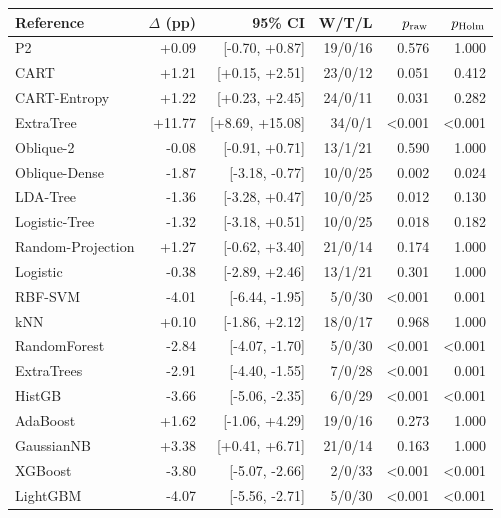 \begin{tabular}{lrrrrr}
\toprule
Reference & $\Delta$ (pp) & 95\% CI & W/T/L & $p_{\rm raw}$ & $p_{\rm Holm}$ \\
\midrule
P2 & +0.09 & [-0.70, +0.87] & 19/0/16 & 0.576 & 1.000 \\
CART & +1.21 & [+0.15, +2.51] & 23/0/12 & 0.051 & 0.412 \\
CART-Entropy & +1.22 & [+0.23, +2.45] & 24/0/11 & 0.031 & 0.282 \\
ExtraTree & +11.77 & [+8.69, +15.08] & 34/0/1 & <0.001 & <0.001 \\
Oblique-2 & -0.08 & [-0.91, +0.71] & 13/1/21 & 0.590 & 1.000 \\
Oblique-Dense & -1.87 & [-3.18, -0.77] & 10/0/25 & 0.002 & 0.024 \\
LDA-Tree & -1.36 & [-3.28, +0.47] & 10/0/25 & 0.012 & 0.130 \\
Logistic-Tree & -1.32 & [-3.18, +0.51] & 10/0/25 & 0.018 & 0.182 \\
Random-Projection & +1.27 & [-0.62, +3.40] & 21/0/14 & 0.174 & 1.000 \\
Logistic & -0.38 & [-2.89, +2.46] & 13/1/21 & 0.301 & 1.000 \\
RBF-SVM & -4.01 & [-6.44, -1.95] & 5/0/30 & <0.001 & 0.001 \\
kNN & +0.10 & [-1.86, +2.12] & 18/0/17 & 0.968 & 1.000 \\
RandomForest & -2.84 & [-4.07, -1.70] & 5/0/30 & <0.001 & <0.001 \\
ExtraTrees & -2.91 & [-4.40, -1.55] & 7/0/28 & <0.001 & 0.001 \\
HistGB & -3.66 & [-5.06, -2.35] & 6/0/29 & <0.001 & <0.001 \\
AdaBoost & +1.62 & [-1.06, +4.29] & 19/0/16 & 0.273 & 1.000 \\
GaussianNB & +3.38 & [+0.41, +6.71] & 21/0/14 & 0.163 & 1.000 \\
XGBoost & -3.80 & [-5.07, -2.66] & 2/0/33 & <0.001 & <0.001 \\
LightGBM & -4.07 & [-5.56, -2.71] & 5/0/30 & <0.001 & <0.001 \\
\bottomrule
\end{tabular}
